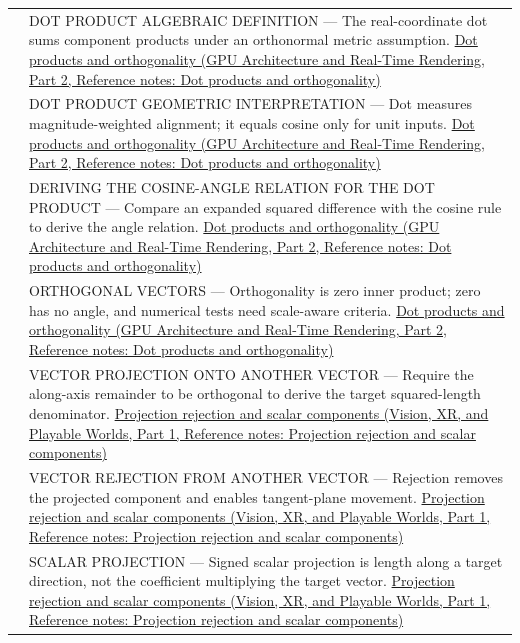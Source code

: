 {\begin{longtable}[]{@{}
  >{\raggedright\arraybackslash}p{}
  >{\raggedright\arraybackslash}p{}@{}}
534 & DOT PRODUCT ALGEBRAIC DEFINITION --- The real-coordinate dot sums component products under an orthonormal metric assumption. \href{../06-GPU-Architecture-and-Real-Time-Rendering-P02/main.pdf\#appendix-8bc4e8fc547c}{Dot products and orthogonality (GPU Architecture and Real-Time Rendering, Part 2, Reference notes: Dot products and orthogonality)} \\
535 & DOT PRODUCT GEOMETRIC INTERPRETATION --- Dot measures magnitude-weighted alignment; it equals cosine only for unit inputs. \href{../06-GPU-Architecture-and-Real-Time-Rendering-P02/main.pdf\#appendix-8bc4e8fc547c}{Dot products and orthogonality (GPU Architecture and Real-Time Rendering, Part 2, Reference notes: Dot products and orthogonality)} \\
536 & DERIVING THE COSINE-ANGLE RELATION FOR THE DOT PRODUCT --- Compare an expanded squared difference with the cosine rule to derive the angle relation. \href{../06-GPU-Architecture-and-Real-Time-Rendering-P02/main.pdf\#appendix-8bc4e8fc547c}{Dot products and orthogonality (GPU Architecture and Real-Time Rendering, Part 2, Reference notes: Dot products and orthogonality)} \\
537 & ORTHOGONAL VECTORS --- Orthogonality is zero inner product; zero has no angle, and numerical tests need scale-aware criteria. \href{../06-GPU-Architecture-and-Real-Time-Rendering-P02/main.pdf\#appendix-8bc4e8fc547c}{Dot products and orthogonality (GPU Architecture and Real-Time Rendering, Part 2, Reference notes: Dot products and orthogonality)} \\
538 & VECTOR PROJECTION ONTO ANOTHER VECTOR --- Require the along-axis remainder to be orthogonal to derive the target squared-length denominator. \href{../07-Vision-XR-and-Playable-Worlds-P01/main.pdf\#appendix-505a502c372a}{Projection rejection and scalar components (Vision, XR, and Playable Worlds, Part 1, Reference notes: Projection rejection and scalar components)} \\
539 & VECTOR REJECTION FROM ANOTHER VECTOR --- Rejection removes the projected component and enables tangent-plane movement. \href{../07-Vision-XR-and-Playable-Worlds-P01/main.pdf\#appendix-505a502c372a}{Projection rejection and scalar components (Vision, XR, and Playable Worlds, Part 1, Reference notes: Projection rejection and scalar components)} \\
540 & SCALAR PROJECTION --- Signed scalar projection is length along a target direction, not the coefficient multiplying the target vector. \href{../07-Vision-XR-and-Playable-Worlds-P01/main.pdf\#appendix-505a502c372a}{Projection rejection and scalar components (Vision, XR, and Playable Worlds, Part 1, Reference notes: Projection rejection and scalar components)} \\

\end{longtable}}
